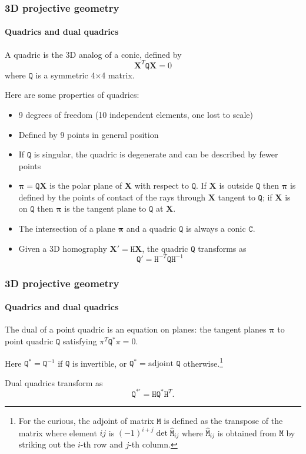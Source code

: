 \documentclass[aspectratio=169]{beamer}
\renewcommand{\vec}[1]{\boldsymbol{#1}}
\newcommand{\mat}[1]{\mathtt{#1}}
\begin{document}
\begin{frame}
\frametitle{3D projective geometry}
\framesubtitle{Quadrics and dual quadrics}

A \alert{quadric} is the 3D analog of a conic, defined by
\begin{equation*}
\vec{X}^T \mat{Q} \vec{X} = 0
\end{equation*}
where $\mat{Q}$ is a symmetric 4$\times$4 matrix.

\medskip

Here are some properties of quadrics:
\begin{itemize}
\item 9 degrees of freedom (10 independent elements, one lost to
  scale)
\item Defined by 9 points in general position
\item If $\mat{Q}$ is singular, the quadric is \alert{degenerate} and
  can be described by fewer points
\item $\vec{\pi}=\mat{Q}\vec{X}$ is the \alert{polar plane} of
  $\vec{X}$ with respect to $\mat{Q}$.  If $\vec{X}$ is outside
  $\mat{Q}$ then $\vec{\pi}$ is defined by the points of contact of
  the rays through $\vec{X}$ tangent to $\mat{Q}$; if $\vec{X}$ is on
  $\mat{Q}$ then $\vec{\pi}$ is the tangent plane to $\mat{Q}$ at
  $\vec{X}$.
\item The intersection of a plane $\vec{\pi}$ and a quadric $\mat{Q}$
  is always a conic $\mat{C}$.
\item Given a 3D homography $\vec{X}'=\mat{H}\vec{X}$, the quadric
  $\mat{Q}$ transforms as \[ \mat{Q}' =
  \mat{H}^{-T}\mat{Q}\mat{H}^{-1} \]
\end{itemize}

\end{frame}

\begin{frame}
\frametitle{3D projective geometry}
\framesubtitle{Quadrics and dual quadrics}

The dual of a point quadric is an equation on planes: the tangent
planes $\vec{\pi}$ to point quadric $\mat{Q}$ satisfying
$\mat{\pi}^T\mat{Q}^*\mat{\pi} = 0$.

\medskip

Here $\mat{Q}^*=\mat{Q}^{-1}$ if $\mat{Q}$ is invertible, or
$\mat{Q}^*= \textrm{adjoint } \mat{Q}$ otherwise.\footnote{For the
  curious, the adjoint of matrix $\mat{M}$ is defined as the transpose
  of the matrix where element $ij$ is $(-1)^{i+j} \det
  \hat{\mat{M}}_{ij}$ where $\hat{\mat{M}}_{ij}$ is obtained from
  $\mat{M}$ by striking out the $i$-th row and $j$-th column.}

\medskip

Dual quadrics transform as
\[ \mat{Q}^{*\prime} = \mat{H}\mat{Q}^* \mat{H}^T. \]

\end{frame}
\end{document}
